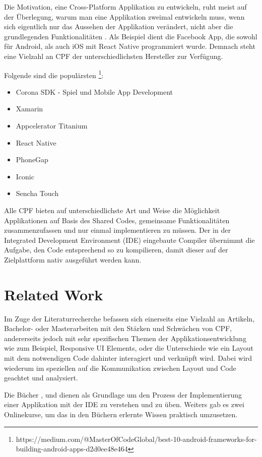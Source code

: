 	\newpage
	Die Motivation, eine Cross-Platform Applikation zu entwickeln, ruht meist auf der Überlegung, warum man eine Applikation zweimal entwickeln muss, wenn sich eigentlich nur das Aussehen der Applikation verändert, nicht aber die grundlegenden Funktionalitäten \cite{Maximilian2017}. Als Beispiel dient die Facebook App, die sowohl für Android, als auch iOS mit React Native programmiert wurde. Demnach steht eine Vielzahl an CPF der unterschiedlichsten Hersteller zur Verfügung.

	Folgende sind die populärsten \footnote{https://medium.com/@MasterOfCodeGlobal/best-10-android-frameworks-for-building-android-apps-d2d0ee48e464}:
	\begin{itemize}
		\setlength\itemsep{0em}
		\item Corona SDK - Spiel und Mobile App Development
		\item Xamarin
		\item Appcelerator Titanium
		\item React Native
		\item PhoneGap
		\item Iconic
		\item Sencha Touch
	\end{itemize}

	Alle CPF bieten auf unterschiedlichste Art und Weise die Möglichkeit Applikationen auf Basis des \grqq Shared Codes\grqq, gemeinsame Funktionalitäten zusammenzufassen und nur einmal implementieren zu müssen. Der in der Integrated Development Environment (IDE) eingebaute Compiler übernimmt die Aufgabe, den Code entsprechend so zu kompilieren, damit dieser auf der Zielplattform nativ ausgeführt werden kann.

\newpage
\section{Related Work}
\label{sec:relatedwork}

Im Zuge der Literaturrecherche befassen sich einerseits eine Vielzahl an Artikeln, Bachelor- oder Masterarbeiten mit den Stärken und Schwächen von CPF, andererseits jedoch mit sehr spezifischen Themen der Applikationsentwicklung wie zum Beispiel, Responsive UI Elements, oder die Unterschiede wie ein Layout mit dem notwendigen Code dahinter interagiert und verknüpft wird. Dabei wird wiederum im speziellen auf die Kommunikation zwischen Layout und Code geachtet und analysiert.

Die Bücher \cite{book:Xamarin.Forms-Succinctly}, \cite{book:Xamarin.Forms-Essentials:} und \cite{book:Cross-platform-UI-Development-with-Xamarin.Forms} dienen als Grundlage um den Prozess der Implementierung einer Applikation mit der IDE zu verstehen und zu üben. Weiters gab es zwei Onlinekurse, um das in den Büchern erlernte Wissen praktisch umzusetzen.

